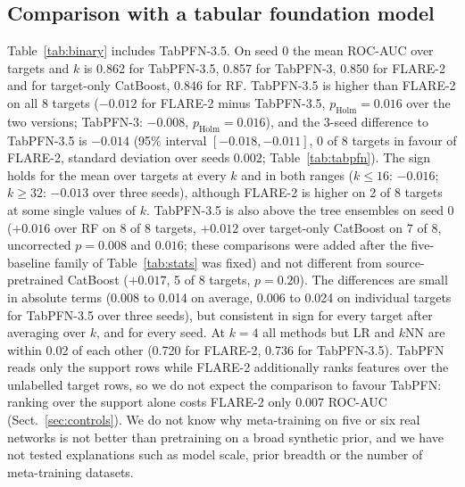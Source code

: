 \documentclass[11pt]{article}
\begin{document}
\subsection{Comparison with a tabular foundation model}
Table~\ref{tab:binary} includes TabPFN-3.5.
On seed 0 the mean ROC-AUC over targets and $k$ is 0.862 for TabPFN-3.5, 0.857 for TabPFN-3, 0.850 for FLARE-2 and for target-only CatBoost, 0.846 for RF.
TabPFN-3.5 is higher than FLARE-2 on all 8 targets ($-0.012$ for FLARE-2 minus TabPFN-3.5, $p_{\text{Holm}}=0.016$ over the two versions; TabPFN-3: $-0.008$, $p_{\text{Holm}}=0.016$), and the 3-seed difference to TabPFN-3.5 is $-0.014$ (95\% interval $[-0.018,-0.011]$, 0 of 8 targets in favour of FLARE-2, standard deviation over seeds 0.002; Table~\ref{tab:tabpfn}).
The sign holds for the mean over targets at every $k$ and in both ranges ($k\le16$: $-0.016$; $k\ge32$: $-0.013$ over three seeds), although FLARE-2 is higher on 2 of 8 targets at some single values of $k$.
TabPFN-3.5 is also above the tree ensembles on seed 0 ($+0.016$ over RF on 8 of 8 targets, $+0.012$ over target-only CatBoost on 7 of 8, uncorrected $p=0.008$ and $0.016$; these comparisons were added after the five-baseline family of Table~\ref{tab:stats} was fixed) and not different from source-pretrained CatBoost ($+0.017$, 5 of 8 targets, $p=0.20$).
The differences are small in absolute terms (0.008 to 0.014 on average, 0.006 to 0.024 on individual targets for TabPFN-3.5 over three seeds), but consistent in sign for every target after averaging over $k$, and for every seed.
At $k=4$ all methods but LR and $k$NN are within 0.02 of each other (0.720 for FLARE-2, 0.736 for TabPFN-3.5).
TabPFN reads only the support rows while FLARE-2 additionally ranks features over the unlabelled target rows, so we do not expect the comparison to favour TabPFN: ranking over the support alone costs FLARE-2 only 0.007 ROC-AUC (Sect.~\ref{sec:controls}).
We do not know why meta-training on five or six real networks is not better than pretraining on a broad synthetic prior, and we have not tested explanations such as model scale, prior breadth or the number of meta-training datasets.

\begin{table}[t]
\centering\small
\caption{FLARE-2 minus TabPFN in binary ROC-AUC, unit = target (8). W/L: targets where FLARE-2 is higher / lower. Seed 0: $p_{\text{Holm}}$ over the two TabPFN versions within each scope. Three seeds: TabPFN-3.5 only, target-averaged over seeds 0--2, exact Wilcoxon $p$ without correction (rows marked 3 seeds). The last column is $p_{\text{Holm}}$ for seed 0 and uncorrected $p$ for three seeds.}\label{tab:tabpfn}

\end{table}
\end{document}
